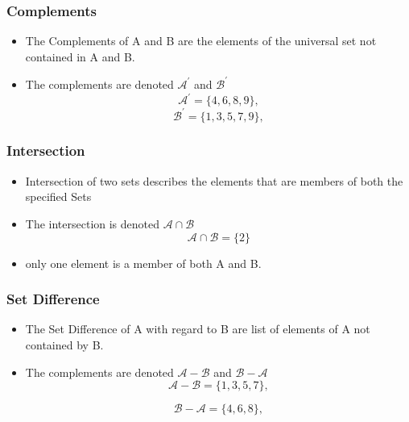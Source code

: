 \documentclass{article}
\begin{document}
\subsubsection*{Complements}
\begin{itemize}
	
	\item The Complements of A and B are the elements of the universal set not contained in A and B.
	
	\item The complements are denoted $\mathcal{A}^{\prime}$ and $\mathcal{B}^{\prime}$
	\[ \mathcal{A}^{\prime} = \{4,6,8,9\}, \]
	\[ \mathcal{B}^{\prime} = \{1,3,5,7,9\}, \]
	
\end{itemize}



\subsubsection*{Intersection}
\begin{itemize}
	
	\item Intersection of two sets describes the elements that are members of both the specified Sets
	
	\item The intersection is denoted $\mathcal{A\cap B}$ 
	\[ \mathcal{A\cap B} = \{2\}\]
	
	\item only one element is a member of both A and B.
\end{itemize}

\subsubsection*{Set Difference}
\begin{itemize}
	
	\item The Set Difference of A with regard to B are list of elements of A not contained by B.
	
	\item The complements are denoted $\mathcal{A-B}$ and $\mathcal{B-A}$
	\[ \mathcal{A-B} = \{1,3,5,7\}, \]
	
	\[ \mathcal{B-A} = \{4,6,8\}, \]
\end{itemize}
\end{document}
